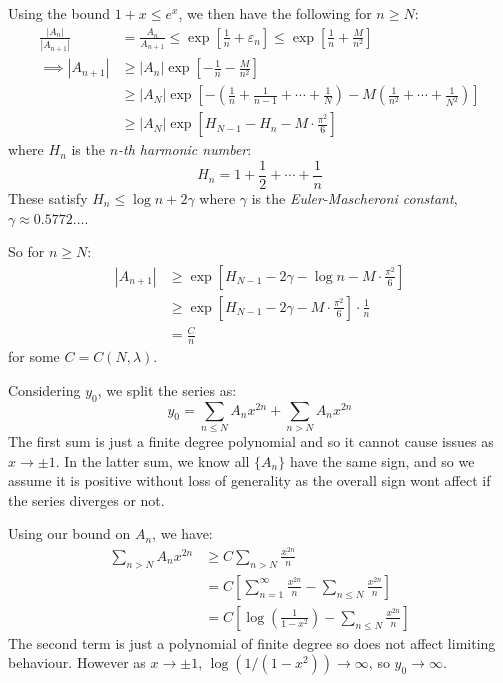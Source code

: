 \documentclass[../main.tex]{subfiles}
\begin{document}
Using the bound $1 + x \leq e^{x}$, we then have the following for $n \geq N$:
\begin{align*}
  \frac{|A_n|}{|A_{n + 1}|} &= \frac{A_n}{A_{n + 1}} \leq \exp\left[\frac{1}{n} + \varepsilon_n\right] \leq \exp\left[\frac{1}{n} + \frac{M}{n^2}\right] \\
  \implies |A_{n + 1}| &\geq |A_n|\exp\left[-\frac{1}{n} - \frac{M}{n^2}\right] \\
                       &\geq |A_N|\exp\left[-\left(\frac{1}{n} + \frac{1}{n - 1} + \cdots + \frac{1}{N}\right) - M\left(\frac{1}{n^2} + \cdots + \frac{1}{N^2}\right)\right] \\
                       &\geq |A_N| \exp\left[H_{N - 1} - H_n - M \cdot \frac{\pi^2}{6}\right]
\end{align*}
where $H_n$ is the \textit{$n$-th harmonic number}:
\[
  H_n = 1 + \frac{1}{2} + \cdots + \frac{1}{n}
\]
These satisfy $H_n \leq \log n + 2 \gamma$ where $\gamma$ is the \textit{Euler-Mascheroni constant}, $\gamma \approx 0.5772\ldots$.

So for $n \geq N$:
\begin{align*}
  |A_{n + 1}| &\geq \exp\left[H_{N - 1} - 2\gamma - \log n - M \cdot \frac{\pi^2}{6}\right] \\
              &\geq \exp\left[H_{N - 1} - 2\gamma - M \cdot \frac{\pi^2}{6}\right] \cdot \frac{1}{n} \\
              &= \frac{C}{n}
\end{align*}
for some $C = C(N, \lambda)$.

Considering $y_0$, we split the series as:
\[
  y_0 = \sum_{n \leq N} A_n x^{2n} + \sum_{n > N} A_n x^{2n}
\]
The first sum is just a finite degree polynomial and so it cannot cause issues as $x \to \pm 1$.
In the latter sum, we know all $\{A_n\}$ have the same sign, and so we assume it is positive without loss of generality as the overall sign wont affect if the series diverges or not.

Using our bound on $A_n$, we have:
\begin{align*}
  \sum_{n > N} A_n x^{2n} &\geq C \sum_{n > N} \frac{x^{2n}}{n} \\
                          &= C\left[\sum_{n = 1}^{\infty} \frac{x^{2n}}{n} - \sum_{n \leq N} \frac{x^{2n}}{n}\right] \\
                          &= C\left[\log\left(\frac{1}{1 - x^2}\right) - \sum_{n \leq N} \frac{x^{2n}}{n}\right]
\end{align*}
The second term is just a polynomial of finite degree so does not affect limiting behaviour.
However as $x \to \pm 1$, $\log(1/(1 - x^2)) \to \infty$, so $y_0 \to \infty$.
\end{document}
